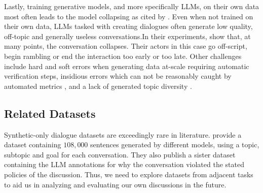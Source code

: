 Lastly, training generative models, and more specifically LLMs, on their own data most often leads to the model collapsing \cite{alemohammad2023selfconsuminggenerativemodelsmad, shumailov2024curserecursiontraininggenerated} as cited by \citet{ulmer2024bootstrappingllmbasedtaskorienteddialogue}. Even when not trained on their own data, LLMs tasked with creating dialogues often generate low quality, off-topic and generally useless conversations.In their experiments, \citet{ulmer2024bootstrappingllmbasedtaskorienteddialogue} show that, at many points, the conversation collapses. Their actors in this case go off-script, begin rambling or end the interaction too early or too late. Other challenges include hard and soft errors when generating data at-scale \cite{lambert2024selfdirectedsyntheticdialoguesrevisions, ulmer2024bootstrappingllmbasedtaskorienteddialogue} requiring automatic verification steps, insidious errors which can not be reasonably caught by automated metrics \cite{lambert2024selfdirectedsyntheticdialoguesrevisions, ulmer2024bootstrappingllmbasedtaskorienteddialogue}, and a lack of generated topic diversity \cite{lambert2024selfdirectedsyntheticdialoguesrevisions}.


\subsection{Related Datasets}
\label{sec:related:datasets}

Synthetic-only dialogue datasets are exceedingly rare in literature. \cite{lambert2024selfdirectedsyntheticdialoguesrevisions} provide a dataset containing  $108,000$ sentences generated by different models, using a topic, subtopic and goal for each conversation. They also publish a sister dataset containing the LLM annotations for why the conversation violated the stated policies of the discussion. Thus, we need to explore datasets from adjacent tasks to aid us in analyzing and evaluating our own discussions in the future.

